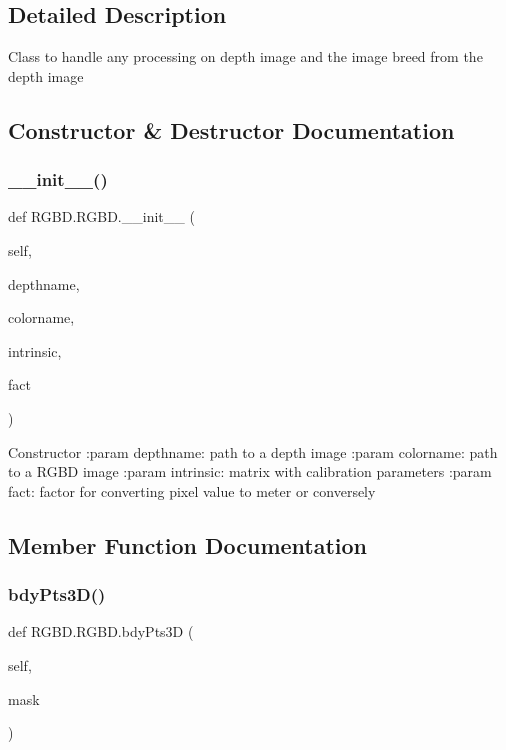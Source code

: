 \subsection{Detailed Description}
\begin{DoxyVerb}Class to handle any processing on depth image and the image breed from the depth image
\end{DoxyVerb}
 

\subsection{Constructor \& Destructor Documentation}
\mbox{\label{class_r_g_b_d_1_1_r_g_b_d_adf3e96f8b0620fd3f68b2399d29c3b12}} 
\subsubsection{\+\_\+\+\_\+init\+\_\+\+\_\+()}
{\footnotesize\ttfamily def R\+G\+B\+D.\+R\+G\+B\+D.\+\_\+\+\_\+init\+\_\+\+\_\+ (\begin{DoxyParamCaption}\item[{}]{self,  }\item[{}]{depthname,  }\item[{}]{colorname,  }\item[{}]{intrinsic,  }\item[{}]{fact }\end{DoxyParamCaption})}

\begin{DoxyVerb}Constructor
:param depthname: path to a depth image
:param colorname: path to a RGBD image
:param intrinsic: matrix with calibration parameters
:param fact: factor for converting pixel value to meter or conversely
\end{DoxyVerb}
 

\subsection{Member Function Documentation}
\mbox{\label{class_r_g_b_d_1_1_r_g_b_d_aa1f7a6e1fa3435e33b779f2b3cd983fd}} 
\subsubsection{bdy\+Pts3\+D()}
{\footnotesize\ttfamily def R\+G\+B\+D.\+R\+G\+B\+D.\+bdy\+Pts3D (\begin{DoxyParamCaption}\item[{}]{self,  }\item[{}]{mask }\end{DoxyParamCaption})}

